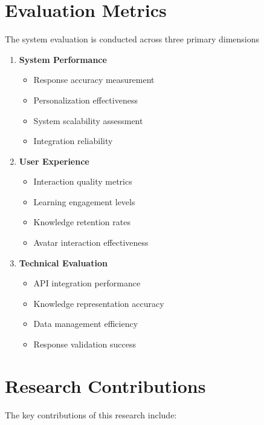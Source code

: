 \section{Evaluation Metrics}
\label{sec:evaluation-metrics}

The system evaluation is conducted across three primary dimensions

\begin{enumerate}
    \item \textbf{System Performance}
        \begin{itemize}
            \item Response accuracy measurement
            \item Personalization effectiveness
            \item System scalability assessment
            \item Integration reliability
        \end{itemize}
    
    \item \textbf{User Experience}
        \begin{itemize}
            \item Interaction quality metrics
            \item Learning engagement levels
            \item Knowledge retention rates
            \item Avatar interaction effectiveness
        \end{itemize}
    
    \item \textbf{Technical Evaluation}
        \begin{itemize}
            \item API integration performance
            \item Knowledge representation accuracy
            \item Data management efficiency
            \item Response validation success
        \end{itemize}
\end{enumerate}

\section{Research Contributions}
\label{sec:research-contributions}

The key contributions of this research include:

